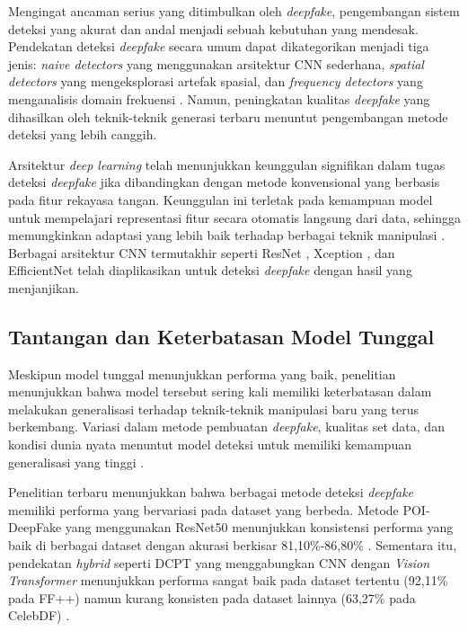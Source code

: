 Mengingat ancaman serius yang ditimbulkan oleh \textit{deepfake}, pengembangan sistem deteksi yang akurat dan andal menjadi sebuah kebutuhan yang mendesak. Pendekatan deteksi \textit{deepfake} secara umum dapat dikategorikan menjadi tiga jenis: \textit{naive detectors} yang menggunakan arsitektur CNN sederhana, \textit{spatial detectors} yang mengeksplorasi artefak spasial, dan \textit{frequency detectors} yang menganalisis domain frekuensi \cite{verdoliva2020deepfake}. Namun, peningkatan kualitas \textit{deepfake} yang dihasilkan oleh teknik-teknik generasi terbaru menuntut pengembangan metode deteksi yang lebih canggih.

Arsitektur \textit{deep learning} telah menunjukkan keunggulan signifikan dalam tugas deteksi \textit{deepfake} jika dibandingkan dengan metode konvensional yang berbasis pada fitur rekayasa tangan. Keunggulan ini terletak pada kemampuan model untuk mempelajari representasi fitur secara otomatis langsung dari data, sehingga memungkinkan adaptasi yang lebih baik terhadap berbagai teknik manipulasi \cite{lecun2015deep}. Berbagai arsitektur CNN termutakhir seperti ResNet \cite{he2016deep}, Xception \cite{szegedy2016rethinking}, dan EfficientNet \cite{tan2019efficientnet} telah diaplikasikan untuk deteksi \textit{deepfake} dengan hasil yang menjanjikan.

\subsection{Tantangan dan Keterbatasan Model Tunggal}

Meskipun model tunggal menunjukkan performa yang baik, penelitian menunjukkan bahwa model tersebut sering kali memiliki keterbatasan dalam melakukan generalisasi terhadap teknik-teknik manipulasi baru yang terus berkembang. Variasi dalam metode pembuatan \textit{deepfake}, kualitas set data, dan kondisi dunia nyata menuntut model deteksi untuk memiliki kemampuan generalisasi yang tinggi \cite{edwards2024}. 

Penelitian terbaru menunjukkan bahwa berbagai metode deteksi \textit{deepfake} memiliki performa yang bervariasi pada dataset yang berbeda. Metode POI-DeepFake yang menggunakan ResNet50 menunjukkan konsistensi performa yang baik di berbagai dataset dengan akurasi berkisar 81,10\%-86,80\% \cite{cozzolino2023}. Sementara itu, pendekatan \textit{hybrid} seperti DCPT yang menggabungkan CNN dengan \textit{Vision Transformer} menunjukkan performa sangat baik pada dataset tertentu (92,11\% pada FF++) namun kurang konsisten pada dataset lainnya (63,27\% pada CelebDF) \cite{wang2023deep}.

